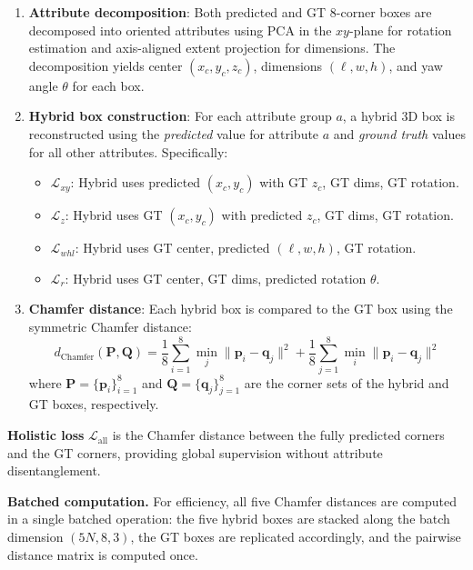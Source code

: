 \documentclass[runningheads]{llncs}
\begin{document}
\begin{enumerate}
    \item \textbf{Attribute decomposition}: Both predicted and GT 8-corner boxes are decomposed into oriented attributes using PCA in the $xy$-plane for rotation estimation and axis-aligned extent projection for dimensions.
    The decomposition yields center $(x_c, y_c, z_c)$, dimensions $(\ell, w, h)$, and yaw angle $\theta$ for each box.
    
    \item \textbf{Hybrid box construction}: For each attribute group $a$, a hybrid 3D box is reconstructed using the \emph{predicted} value for attribute $a$ and \emph{ground truth} values for all other attributes. Specifically:
    \begin{itemize}
        \item $\mathcal{L}_{xy}$: Hybrid uses predicted $(x_c, y_c)$ with GT $z_c$, GT dims, GT rotation.
        \item $\mathcal{L}_z$: Hybrid uses GT $(x_c, y_c)$ with predicted $z_c$, GT dims, GT rotation.
        \item $\mathcal{L}_{whl}$: Hybrid uses GT center, predicted $(\ell, w, h)$, GT rotation.
        \item $\mathcal{L}_r$: Hybrid uses GT center, GT dims, predicted rotation $\theta$.
    \end{itemize}
    
    \item \textbf{Chamfer distance}: Each hybrid box is compared to the GT box using the symmetric Chamfer distance:
    \begin{equation}
        d_{\text{Chamfer}}(\mathbf{P}, \mathbf{Q}) = \frac{1}{8}\sum_{i=1}^{8} \min_{j} \|\mathbf{p}_i - \mathbf{q}_j\|^2 + \frac{1}{8}\sum_{j=1}^{8} \min_{i} \|\mathbf{p}_i - \mathbf{q}_j\|^2
    \end{equation}
    where $\mathbf{P} = \{\mathbf{p}_i\}_{i=1}^{8}$ and $\mathbf{Q} = \{\mathbf{q}_j\}_{j=1}^{8}$ are the corner sets of the hybrid and GT boxes, respectively.
\end{enumerate}

\noindent\textbf{Holistic loss} $\mathcal{L}_{\text{all}}$ is the Chamfer distance between the fully predicted corners and the GT corners, providing global supervision without attribute disentanglement.

\noindent\textbf{Batched computation.}
For efficiency, all five Chamfer distances are computed in a single batched operation: the five hybrid boxes are stacked along the batch dimension $(5N, 8, 3)$, the GT boxes are replicated accordingly, and the pairwise distance matrix is computed once.
\end{document}
